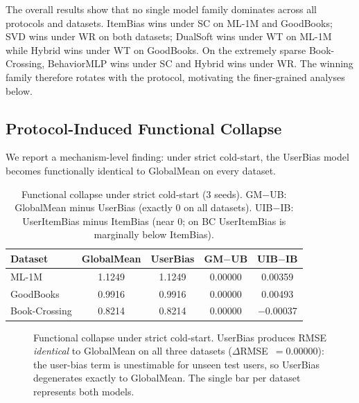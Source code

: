 \documentclass[journal]{IEEEtran}
\begin{document}
The overall results show that no single model family dominates across all protocols and datasets. ItemBias wins under SC on ML-1M and GoodBooks; SVD wins under WR on both datasets; DualSoft wins under WT on ML-1M while Hybrid wins under WT on GoodBooks. On the extremely sparse Book-Crossing, BehaviorMLP wins under SC and Hybrid wins under WR. The winning family therefore rotates with the protocol, motivating the finer-grained analyses below.

\subsection{Protocol-Induced Functional Collapse}
\label{sec:collapse}

We report a mechanism-level finding: under strict cold-start, the UserBias model becomes functionally identical to GlobalMean on every dataset.

\begin{table}[!t]
\centering
\caption{Functional collapse under strict cold-start (3 seeds). GM$-$UB: GlobalMean minus UserBias (exactly 0 on all datasets). UIB$-$IB: UserItemBias minus ItemBias (near 0; on BC UserItemBias is marginally below ItemBias).}
\label{tab:collapse}
\footnotesize
\begin{tabular}{@{}lcccc@{}}
\toprule
Dataset & GlobalMean & UserBias & GM$-$UB & UIB$-$IB \\
\midrule
ML-1M         & 1.1249 & 1.1249 & 0.00000 & 0.00359 \\
GoodBooks     & 0.9916 & 0.9916 & 0.00000 & 0.00493 \\
Book-Crossing & 0.8214 & 0.8214 & 0.00000 & $-$0.00037 \\
\bottomrule
\end{tabular}
\end{table}

\begin{figure}[!t]
\centering
{}
\caption{Functional collapse under strict cold-start. UserBias produces RMSE \emph{identical} to GlobalMean on all three datasets ($\Delta$RMSE~$=0.00000$): the user-bias term is unestimable for unseen test users, so UserBias degenerates exactly to GlobalMean. The single bar per dataset represents both models.}
\label{fig:collapse}
\end{figure}
\end{document}
